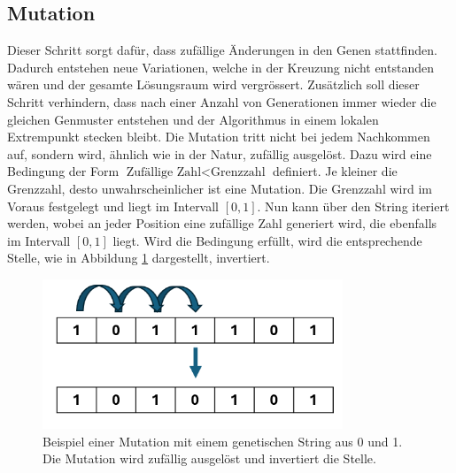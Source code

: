 %
%
%
%
\subsection{Mutation
\label{buch:paper:varalg:subsection:mutation}}
Dieser Schritt sorgt dafür, dass zufällige Änderungen in den Genen 
stattfinden. Dadurch entstehen neue Variationen, welche in der 
Kreuzung nicht entstanden wären und der gesamte Lösungsraum wird 
vergrössert. Zusätzlich soll dieser Schritt verhindern, dass nach 
einer Anzahl von Generationen immer wieder die gleichen 
Genmuster entstehen und der Algorithmus in einem lokalen Extrempunkt 
stecken bleibt.
Die Mutation tritt nicht bei jedem Nachkommen auf, sondern wird, 
ähnlich wie in der Natur, zufällig ausgelöst. Dazu wird eine Bedingung 
der Form \( \text{Zufällige Zahl} < \text{Grenzzahl} \) definiert. 
Je kleiner die Grenzzahl, desto unwahrscheinlicher ist eine Mutation. 
Die Grenzzahl wird im Voraus festgelegt und liegt im Intervall \([0,1]\).
Nun kann über den String iteriert werden, wobei an jeder Position eine 
zufällige Zahl generiert wird, die ebenfalls im Intervall \([0,1]\) 
liegt. Wird die Bedingung erfüllt, wird die entsprechende Stelle, 
wie in Abbildung \ref{fig:mutation_genetic_string} dargestellt,
invertiert.
\begin{figure}
	\centering
	\includegraphics[width=0.8\textwidth]{
        papers/varalg/images/teil3/09GeneticStringMutation.png
        }
	\caption{
	Beispiel einer Mutation mit einem genetischen String aus 0 und 1. Die
	Mutation wird zufällig ausgelöst und invertiert die Stelle.
	}
	\label{fig:mutation_genetic_string}
\end{figure}

